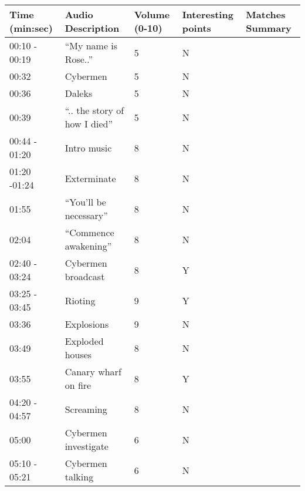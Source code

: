 \begin{longtable}{| p{70pt} | p{130pt} | p{45pt} | p{57pt} | p{60pt}|}
\hline
\textbf{Time (min:sec)} & \textbf{Audio Description} & \textbf{Volume (0-10)} &\textbf{ Interesting points} & \textbf{Matches Summary}\\ \hline
00:10 - 00:19           &          ``My name is Rose..''           &          5           &          N&\\\hline       
00:32           &          Cybermen           &          5           &          N&\\\hline       
00:36           &          Daleks           &          5           &          N&\\\hline       
00:39           &          ``.. the story of how I died''           &          5           &          N&\\\hline       
00:44 - 01:20           &          Intro music           &          8           &          N&\\\hline       
01:20 -01:24           &          Exterminate           &          8           &          N&\\\hline       
01:55           &          ``You'll be necessary''           &          8           &          N&\\\hline       
02:04           &          ``Commence awakening''           &          8           &          N&\\\hline       
02:40 - 03:24           &          Cybermen broadcast           &          8           &          Y&\\\hline       
03:25 - 03:45           &          Rioting           &          9           &          Y&\\\hline       
03:36           &          Explosions           &          9           &          N&\\\hline       
03:49           &          Exploded houses           &          8           &          N&\\\hline       
03:55           &          Canary wharf on fire           &          8           &          Y&\\\hline       
04:20 - 04:57           &          Screaming           &          8           &          N&\\\hline       
05:00           &          Cybermen investigate           &          6           &          N&\\\hline       
05:10 - 05:21           &          Cybermen talking           &          6           &          N&\\\hline       

\end{longtable}
